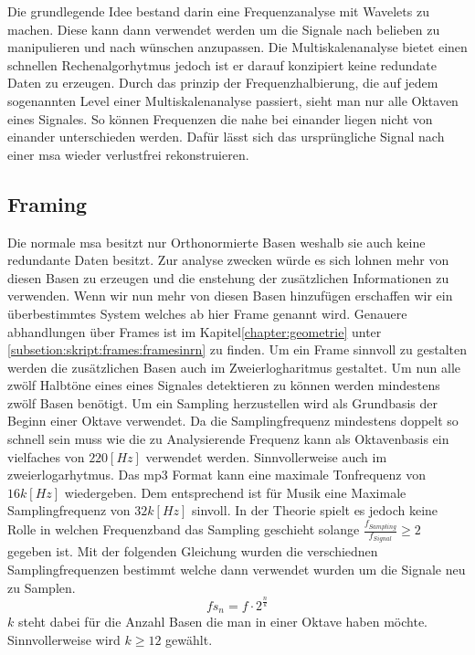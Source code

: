 



Die grundlegende Idee bestand darin eine Frequenzanalyse mit Wavelets zu machen. Diese kann dann verwendet werden um die Signale nach belieben zu manipulieren und nach wünschen anzupassen. Die Multiskalenanalyse bietet einen schnellen Rechenalgorhytmus jedoch ist er darauf konzipiert keine redundate Daten zu erzeugen. Durch das prinzip der Frequenzhalbierung, die auf jedem sogenannten Level einer Multiskalenanalyse passiert, sieht man nur alle Oktaven eines Signales. So können Frequenzen die nahe bei einander liegen nicht von einander unterschieden werden. Dafür lässt sich das ursprüngliche Signal nach einer msa wieder verlustfrei rekonstruieren. 

\subsection{Framing}
Die normale msa besitzt nur Orthonormierte Basen weshalb sie auch keine redundante Daten besitzt. Zur analyse zwecken würde es sich lohnen mehr von diesen Basen zu erzeugen und die enstehung der zusätzlichen Informationen zu verwenden. Wenn wir nun mehr von diesen Basen hinzufügen erschaffen wir ein überbestimmtes System welches ab hier Frame genannt wird. Genauere abhandlungen über Frames ist im Kapitel\ref{chapter:geometrie} unter \ref{subsetion:skript:frames:framesinrn} zu finden. Um ein Frame sinnvoll zu gestalten werden die zusätzlichen Basen auch im Zweierlogharitmus gestaltet. Um nun alle zwölf Halbtöne eines eines Signales detektieren zu können werden mindestens zwölf Basen benötigt. Um ein Sampling herzustellen wird als Grundbasis der Beginn einer Oktave verwendet. Da die Samplingfrequenz mindestens doppelt so schnell sein muss wie die zu Analysierende Frequenz kann als Oktavenbasis ein vielfaches von $220[Hz]$ verwendet werden. Sinnvollerweise auch im zweierlogarhytmus. Das mp3 Format kann eine maximale Tonfrequenz von $16k[Hz]$ wiedergeben. Dem entsprechend ist für Musik eine Maximale Samplingfrequenz von $32k[Hz]$ sinvoll. In der Theorie spielt es jedoch keine Rolle in welchen Frequenzband das Sampling geschieht solange $\frac{f_{Sampling}}{f_{Signal}}\geq2$ gegeben ist. Mit der folgenden Gleichung wurden die verschiednen Samplingfrequenzen bestimmt welche dann verwendet wurden um die Signale neu zu Samplen. 
\begin{equation}
fs_{n}=f\cdot2^{\frac{n}{k}}
\end{equation}
$k$ steht dabei für die Anzahl Basen die man in einer Oktave haben möchte. Sinnvollerweise wird $k \geq 12$ gewählt.\\

